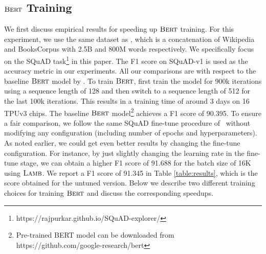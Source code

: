 \documentclass{article} \usepackage{iclr2020_conference,times}
\newcommand{\bert}{\textsc{Bert}\xspace}
\newcommand{\lamb}{\textsc{Lamb}}
\begin{document}
\subsection{$\bert$ Training}
We first discuss empirical results for speeding up $\bert$ training. For this experiment, we use the same dataset as \cite{devlin2018bert}, which is a concatenation of Wikipedia and BooksCorpus with 2.5B and 800M words respectively. We specifically focus on the SQuAD task\footnote{https://rajpurkar.github.io/SQuAD-explorer/} in this paper. 
The F1 score on SQuAD-v1 is used as the accuracy metric in our experiments. All our comparisons are with respect to the baseline $\bert$ model by \cite{devlin2018bert}. To train $\bert$, \citet{devlin2018bert} first train the model for 900k iterations using a sequence length of 128 and then switch to a sequence length of 512 for the last 100k iterations. This results in a training time of around 3 days on 16 TPUv3 chips. The baseline $\bert$ model\footnote{Pre-trained BERT model can be downloaded  from https://github.com/google-research/bert} achieves a F1 score of 90.395. To ensure a fair comparison, we follow the same SQuAD fine-tune procedure of~\cite{devlin2018bert} without modifying any configuration (including number of epochs and hyperparameters). As noted earlier, we could get even better results by changing the fine-tune configuration. For instance, by just slightly changing the learning rate in the fine-tune stage, we can obtain a higher F1 score of 91.688 for the batch size of 16K using $\lamb$. We report a F1 score of 91.345 in Table \ref{table:results}, which is the score obtained for the untuned version. Below we describe two different training choices for training $\bert$ and discuss the corresponding speedups.
\end{document}
